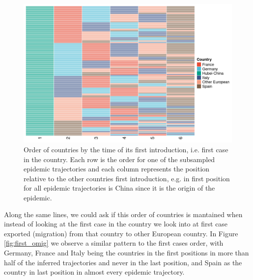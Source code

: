 \documentclass[12pt]{article}
\begin{document}
\begin{figure}[ht]
    \centering
    \includegraphics[width=\textwidth]{201030_europe3_figtraj05.png}
    \caption{Order of countries by the time of its first introduction, i.e. first case in the country. Each row is the order for one of the subsampled epidemic trajectories and each column represents the position relative to the other countries first introduction, e.g. in first position for all epidemic trajectories is China since it is the origin of the epidemic.} 
    \label{fig:first_imig}
\end{figure}

Along the same lines, we could ask if this order of countries is mantained when instead of looking at the first case in the country we look into at first case exported (migration) from that country to other European country. In Figure \ref{fig:first_omig} we observe a similar pattern to the first cases order, with Germany, France and Italy being the countries in the first positions in more than half of the inferred trajectories and never in the last position, and Spain as the country in last position in almost every epidemic trajectory.\\
\end{document}
